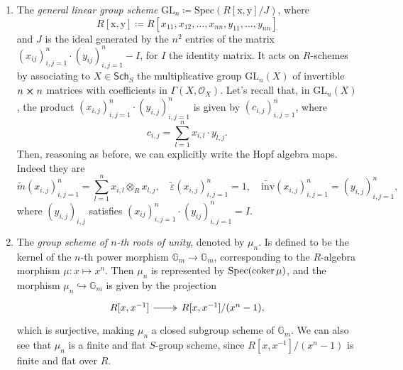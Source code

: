 \begin{ex}
\begin{enumerate}
		\item The {\em general linear group scheme} $\mathrm{GL}_n \coloneqq 
			\mathrm{Spec}(R[\mathrm{x},\mathrm{y}]/J)$,
			where
			\begin{equation*}
				R[\mathrm{x},\mathrm{y}] \coloneqq
				R[x_{11}, x_{12}, \ldots, x_{nn},
				y_{11}, \ldots, y_{nn}]
			\end{equation*} 
			and $J$ is the ideal generated by the $n^2$ entries of the matrix
			$\left( x_{ij} \right)_{i,j=1}^n \cdot \left( y_{ij} \right)_{i,j=1}^n - I$,
			for $I$ the identity matrix.
			It acts on $R$-schemes by associating to
			$X \in \mathsf{Sch}_{ S }$ the multiplicative group
			$\mathrm{GL}_n(X)$ of invertible $n \cross n$
			matrices with coefficients in $\Gamma \left( X , \mathcal{O}_{ X } \right)$.
			Let's recall that, in $\mathrm{GL}_n(X)$, the product
			$\left( x_{i,j} \right)_{i,j = 1}^n \cdot 
			\left( y_{i,j} \right)_{i,j = 1}^n$
			is given by $\left( c_{i,j} \right)_{i,j = 1}^n$, where
			\begin{equation*}
			c_{i,j} = \sum_{l=1}^{n} x_{i,l} \cdot y_{l,j}
			.\end{equation*} 
			Then, reasoning as before, we can explicitly write the Hopf algebra maps.
			Indeed they are
			\begin{equation*}
				\widetilde{m}(x_{i,j})_{i,j=1}^n = \sum_{l=1}^{n} x_{i,l} \otimes_R x_{l,j},
				\quad
				\widetilde{\varepsilon}(x_{i,j})_{i,j=1}^n = 1,
				\quad
				\widetilde{\mathrm{inv}}(x_{i,j})_{i,j=1}^n = (y_{i,j})_{i,j=1}^n
			,\end{equation*} 
			where $\left( y_{i,j} \right)_{i,j}$ satisfies 
			$\left( x_{ij} \right)_{i,j=1}^n \cdot \left( y_{ij} \right)_{i,j=1}^n = I$.


		\item The {\em group scheme of $n$-th roots of unity}, denoted by $\mu_n$.
			Is defined to be the kernel of the $n$-th power morphism
			$\mathbb{G}_m \to \mathbb{G}_m$,
			corresponding to the $R$-algebra morphism
			$\mu\colon x \mapsto x^n$.
			Then $\mu_n$ is represented by $\mathrm{Spec}(\operatorname{coker} \mu)$,
			and the morphism $\mu_n \hookrightarrow \mathbb{G}_m$ is given by the projection
			\begin{equation*}
			\begin{tikzcd}
				R[x,x^{-1}] \arrow[r, "", twoheadrightarrow] &
				R[x,x^{-1}] / (x^n - 1)
			,\end{tikzcd}
			\end{equation*}
			which is surjective, making $\mu_n$
			a closed subgroup scheme of $\mathbb{G}_m$.
			We can also see that 
			$\mu_n$ is a finite and flat $S$-group scheme, 
			since $R[x,x^{-1}] / (x^n-1)$ is finite and flat over $R$.



\end{enumerate}
\end{ex}
